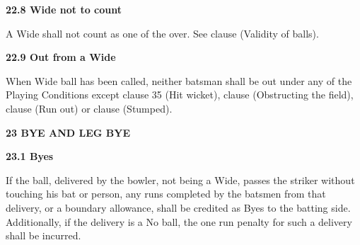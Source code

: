 \documentclass[12pt]{article}
\begin{document}
\vspace{\baselineskip}
{\fontsize{11pt}{13.2pt}\selectfont \textbf{22.8 \tabto{0.47in} Wide not to count}\par}\par


\vspace{\baselineskip}
{\fontsize{9pt}{10.8pt}\selectfont A Wide shall not count as one of the over. See clause (Validity of balls).\par}\par


\vspace{\baselineskip}
{\fontsize{11pt}{13.2pt}\selectfont \textbf{22.9 \tabto{0.47in} Out from a Wide}\par}\par


\vspace{\baselineskip}
\begin{adjustwidth}{0.0in}{0.1in}
\begin{justify}
{\fontsize{9pt}{10.8pt}\selectfont When Wide ball has been called, neither batsman shall be out under any of the Playing Conditions except clause 35 (Hit wicket), clause (Obstructing the field), clause (Run out) or clause (Stumped).\par}
\end{justify}\par

\end{adjustwidth}


\vspace{\baselineskip}
{\fontsize{16pt}{19.2pt}\selectfont \textbf{23 BYE AND LEG BYE}\par}\par


\vspace{\baselineskip}
{\fontsize{11pt}{13.2pt}\selectfont \textbf{23.1 \tabto{0.47in} Byes}\par}\par


\vspace{\baselineskip}
\begin{adjustwidth}{0.0in}{0.1in}
\begin{justify}
{\fontsize{9pt}{10.8pt}\selectfont If the ball, delivered by the bowler, not being a Wide, passes the striker without touching his bat or person, any runs completed by the batsmen from that delivery, or a boundary allowance, shall be credited as Byes to the batting side. Additionally, if the delivery is a No ball, the one run penalty for such a delivery shall be incurred.\par}
\end{justify}\par

\end{adjustwidth}
\end{document}
